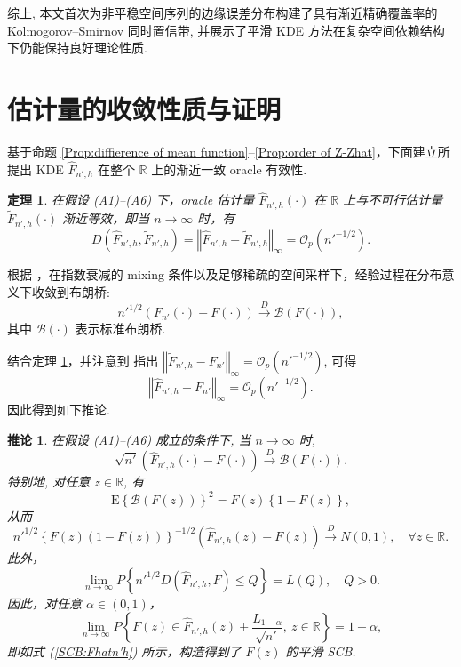\documentclass[a4paper,openay,14pt]{ctexbook}
\newtheorem{thm}{定理}[section]
\numberwithin{equation}{section}
\numberwithin{lem}{section}
\newtheorem{coro}[theorem]{推论}%
\begin{document}
综上, 本文首次为非平稳空间序列的边缘误差分布构建了具有渐近精确覆盖率的 Kolmogorov--Smirnov 同时置信带, 并展示了平滑 KDE 方法在复杂空间依赖结构下仍能保持良好理论性质.

\section{估计量的收敛性质与证明}

基于命题 \ref{Prop:diffierence of mean function}–\ref{Prop:order of Z-Zhat}，下面建立所提出 KDE $\hat{F}_{n',h}$ 在整个 $\mathbb{R}$ 上的渐近一致 oracle 有效性.
\begin{thm} \label{THM:FhatFtilde}
在假设 (A1)–(A6) 下，oracle 估计量 $\hat{F}_{n',h}(\cdot)$ 在 $\mathbb{R}$ 上与不可行估计量 $\tilde{F}_{n',h}(\cdot)$ 渐近等效，即当 $n \to \infty$ 时，有
\[
D\left(\hat{F}_{n',h}, \tilde{F}_{n',h}\right)
= \left\Vert \hat{F}_{n',h} - \tilde{F}_{n',h} \right\Vert_{\infty}
= {\scriptstyle{\mathcal{O}}}_p\left(n'^{-1/2}\right).
\]
\end{thm}

根据 \cite{fazekas2003limit}，在指数衰减的 mixing 条件以及足够稀疏的空间采样下，经验过程在分布意义下收敛到布朗桥:
\[
n'^{1/2}\left(F_{n'}(\cdot) - F(\cdot)\right)
\overset{D}{\rightarrow} \mathcal{B}(F(\cdot)),
\]
其中 $\mathcal{B}(\cdot)$ 表示标准布朗桥.

结合定理 \ref{THM:FhatFtilde}，并注意到 \cite{wang2013smooth} 指出
$\left\Vert \tilde{F}_{n',h} - F_{n'} \right\Vert_{\infty}
= {\scriptstyle{\mathcal{O}}}_p\left(n'^{-1/2}\right)$,
可得
\[
\left\Vert \hat{F}_{n',h} - F_{n'} \right\Vert_{\infty}
= {\scriptstyle{\mathcal{O}}}_p\left(n'^{-1/2}\right).
\]
因此得到如下推论.

\begin{coro} \label{corollary:KDESCB}
在假设 (A1)–(A6) 成立的条件下, 当 $n \to \infty$ 时,
\[
\sqrt{n'}\left( \hat{F}_{n',h}(\cdot) - F(\cdot) \right)
\overset{D}{\rightarrow} \mathcal{B}(F(\cdot)).
\]
特别地, 对任意 $z \in \mathbb{R}$, 有
\[
\mathrm{E}\left\{ \mathcal{B}(F(z)) \right\}^2
= F(z)\left\{1 - F(z)\right\},
\]
从而
\[
n'^{1/2}\left\{F(z)(1 - F(z))\right\}^{-1/2}
\left( \hat{F}_{n',h}(z) - F(z) \right)
\overset{D}{\rightarrow} N(0,1), \quad \forall z \in \mathbb{R}.
\]
此外，
\[
\lim_{n \to \infty}
P\left\{ n'^{1/2} D\left(\hat{F}_{n',h}, F\right) \le Q \right\}
= L(Q), \quad Q > 0.
\]
因此，对任意 $\alpha \in (0,1)$，
\[
\lim_{n \to \infty}
P\left\{ F(z) \in \hat{F}_{n',h}(z)
\pm \frac{L_{1-\alpha}}{\sqrt{n'}},
\ z \in \mathbb{R} \right\}
= 1 - \alpha,
\]
即如式 (\ref{SCB:Fhatn'h}) 所示，构造得到了 $F(z)$ 的平滑 SCB.
\end{coro}
\end{document}
